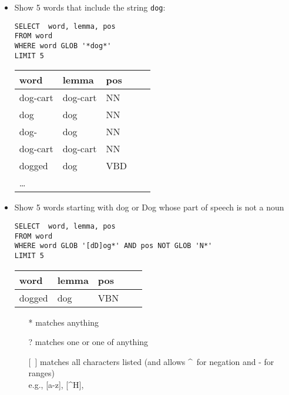 \documentclass[a4paper,landscape,headrule,footrule,xetex]{foils}
\begin{document}
\begin{itemize}
\item Show 5 words that include the string \texttt{dog}:
\begin{verbatim}
SELECT  word, lemma, pos
FROM word
WHERE word GLOB '*dog*'
LIMIT 5
\end{verbatim}
  \begin{tabular}{lllll}
    \textbf{word}  & \textbf{lemma}  &  \textbf{pos} \\ \hline
dog-cart   & dog-cart   &  NN      \\  
dog        & dog        &  NN    \\    
dog-       & dog        &  NN   \\     
dog-cart   & dog-cart   &  NN   \\     
dogged     & dog        &  VBD   \\
    \ldots
  \end{tabular}
\end{itemize}


\begin{itemize}
\item Show 5 words starting with dog or Dog whose part of speech is not a noun
\begin{verbatim}
SELECT  word, lemma, pos
FROM word
WHERE word GLOB '[dD]og*' AND pos NOT GLOB 'N*'
LIMIT 5
\end{verbatim}
  \begin{tabular}{lllll}
    \textbf{word}  & \textbf{lemma}  &  \textbf{pos} \\ \hline
    dogged  & dog &  VBN \\
  \end{tabular}
\begin{itemize}
\item[*] matches anything
\item[?] matches one or one of anything
\item[{[\ ]}] matches all characters listed (and allows
  \textasciicircum\ for negation and - for ranges)
  \\ e.g., [a-z], [\textasciicircum{}H], 
\end{itemize}
\end{itemize}

\end{document}
